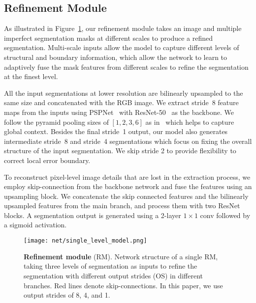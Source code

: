 \documentclass[10pt,twocolumn,letterpaper]{article}
\begin{document}
\vspace{-0.05in}
\subsection{Refinement Module}
\vspace{-0.05in}
As illustrated in Figure~\ref{fig:single_level}, our refinement module takes an image and multiple imperfect segmentation masks at different scales to produce a refined segmentation. 
Multi-scale inputs allow the model to capture different levels of structural and boundary information, which allow the network to learn to adaptively fuse the mask features from different scales to refine the segmentation at the finest level. 

All the input segmentations at lower resolution are bilinearly upsampled to the same size and concatenated with the RGB image. We extract stride~8 feature maps from the inputs using PSPNet~\cite{zhao2017pyramid} with ResNet-50~\cite{he2016deep} as the backbone. We follow the pyramid pooling sizes of $[1, 2, 3, 6]$ as in~\cite{zhao2017pyramid} which helps to capture global context. Besides the final stride~1 output, our model also generates intermediate stride~8 and stride~4 segmentations which focus on fixing the overall structure of the input segmentation. We skip stride 2 to provide flexibility to correct local error boundary.
 
To reconstruct pixel-level image details that are lost in the extraction process, we employ skip-connection from the backbone network and fuse the features using an upsampling block. We concatenate the skip connected features and the bilinearly upsampled features from the main branch, and process them with two ResNet blocks. A segmentation output is generated using a 2-layer $1\times1$ conv followed by a sigmoid activation. 

\begin{figure}[t]
	\begin{center}
		\texttt{[image: net/single\_level\_model.png]}
	\end{center}
	\vspace{-0.15in}
	\caption{\textbf{Refinement module} (RM). Network structure of a single RM, taking three levels of segmentation as inputs to refine the segmentation with different output strides (OS) in different branches. Red lines denote skip-connections. In this paper, we use output strides of 8, 4, and 1.}
	\label{fig:single_level}
	\vspace{-0.15in}
\end{figure}
\end{document}

